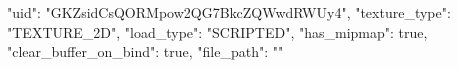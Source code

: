 {
    "uid": "GKZsidCsQORMpow2QG7BkcZQWwdRWUy4",
    "texture_type": "TEXTURE_2D",
    "load_type": "SCRIPTED",
    "has_mipmap": true,
    "clear_buffer_on_bind": true,
    "file_path": ""
}